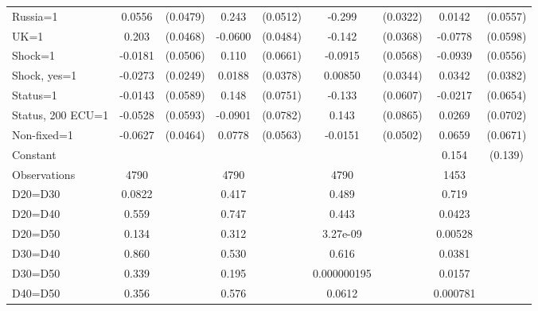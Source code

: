 \begin{tabular}{l|cccccc|cc}
Russia=1        &   0.0556         & (0.0479)&    0.243\sym{***}& (0.0512)&   -0.299\sym{***}& (0.0322)&   0.0142         & (0.0557)\\
UK=1            &    0.203\sym{***}& (0.0468)&  -0.0600         & (0.0484)&   -0.142\sym{***}& (0.0368)&  -0.0778         & (0.0598)\\
Shock=1         &  -0.0181         & (0.0506)&    0.110\sym{*}  & (0.0661)&  -0.0915         & (0.0568)&  -0.0939\sym{*}  & (0.0556)\\
Shock, yes=1    &  -0.0273         & (0.0249)&   0.0188         & (0.0378)&  0.00850         & (0.0344)&   0.0342         & (0.0382)\\
Status=1        &  -0.0143         & (0.0589)&    0.148\sym{**} & (0.0751)&   -0.133\sym{**} & (0.0607)&  -0.0217         & (0.0654)\\
Status, 200 ECU=1&  -0.0528         & (0.0593)&  -0.0901         & (0.0782)&    0.143\sym{*}  & (0.0865)&   0.0269         & (0.0702)\\
Non-fixed=1     &  -0.0627         & (0.0464)&   0.0778         & (0.0563)&  -0.0151         & (0.0502)&   0.0659         & (0.0671)\\
Constant        &                  &         &                  &         &                  &         &    0.154         &  (0.139)\\
\hline
Observations    &     4790         &         &     4790         &         &     4790         &         &     1453         &         \\
D20=D30         &   0.0822         &         &    0.417         &         &    0.489         &         &    0.719         &         \\
D20=D40         &    0.559         &         &    0.747         &         &    0.443         &         &   0.0423         &         \\
D20=D50         &    0.134         &         &    0.312         &         & 3.27e-09         &         &  0.00528         &         \\
D30=D40         &    0.860         &         &    0.530         &         &    0.616         &         &   0.0381         &         \\
D30=D50         &    0.339         &         &    0.195         &         &0.000000195         &         &   0.0157         &         \\
D40=D50         &    0.356         &         &    0.576         &         &   0.0612         &         & 0.000781         &         \\

\end{tabular}
